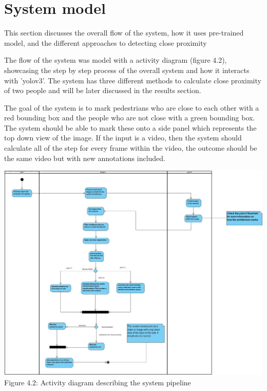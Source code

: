 \documentclass[12pt]{report}
\begin{document}
\section{System model}

This section discusses the overall flow of the system, how it uses pre-trained model, and the different approaches to detecting close proximity 

The flow of the system was model with a activity diagram (figure 4.2), showcasing the step by step process of the overall system and how it interacts with 'yolov3'. The system has three different methods to calculate close proximity of two people and will be later discussed in the results section.

The goal of the system is to mark pedestrians who are close to each other with a red bounding box and the people who are not close with a green bounding box. The system should be able to mark these onto a side panel which represents the top down view of the image. If the input is a video, then the system should calculate all of the step for every frame within the video, the outcome should be the same video but with new annotations included.
 
\vspace{10mm}

\begin{centering}
	\includegraphics[width=170mm]{./images/system design.jpg}
	{Figure 4.2: Activity diagram describing the system pipeline}
	
\end{centering}
\end{document}
